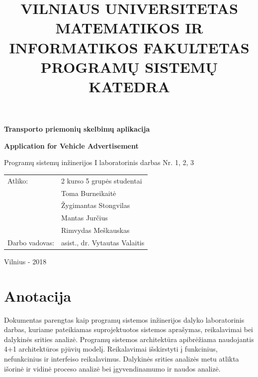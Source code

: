 \documentclass[12pt]{article}
\title{VILNIAUS UNIVERSITETAS \\
MATEMATIKOS IR INFORMATIKOS FAKULTETAS \\
PROGRAMŲ SISTEMŲ KATEDRA}
\author{}
\date{}
\renewcommand{\baselinestretch}{1.5}
\begin{document}
	\clearpage
	\maketitle
	\thispagestyle{empty}

	\bigbreak
	\bigbreak
	\bigbreak
	\bigbreak

	\begin{center}
		\begin{Large}
			\textbf{Transporto priemonių skelbimų aplikacija} \\
		\end{Large}
		\begin{large}
			\textbf{Application for Vehicle Advertisement} \\
		\end{large}
		Programų sistemų inžinerijos I laboratorinis darbas Nr. 1, 2, 3 \\

		\bigbreak
		\bigbreak
		\bigbreak
		\bigbreak
		\bigbreak
		\bigbreak
		\bigbreak
		\bigbreak
		\bigbreak

		\begin{tabular}{ll}
			Atliko:        & 2 kurso 5 grupės studentai \\
		               	   & Toma Burneikaitė \\
		               	   & Žygimantas Stongvilas \\
		                   & Mantas Jurčius \\
		                   & Rimvydas Meškauskas \\
			Darbo vadovas: & asist., dr. Vytautas Valaitis
		\end{tabular}

		\bigbreak
		\bigbreak
		\bigbreak
		\bigbreak
		\bigbreak
		\bigbreak
		\bigbreak
		\bigbreak
		\bigbreak

		Vilnius - 2018
	\end{center}
	\pagebreak
	
	\renewcommand{\baselinestretch}{0.5}
	\tableofcontents
	\renewcommand{\baselinestretch}{1.5}
	\pagebreak	
	
	\part*{Anotacija}
	\begin{indent}
	Dokumentas parengtas kaip programų sistemos inžinerijos dalyko laboratorinis darbas, kuriame pateikiamas suprojektuotos sistemos aprašymas, reikalavimai bei dalykinės srities analizė. Programų sistemos architektūra apibrėžiama naudojantis 4+1 architektūros pjūvių modelį. Reikalavimai išskirstyti į funkcinius, nefunkcinius ir interfeiso reikalavimus. Dalykinės srities analizės metu atlikta išorinė ir vidinė proceso analizė bei įgyvendinamumo ir naudos analizė.
	\end{indent}
	\pagebreak
	
\end{document}

